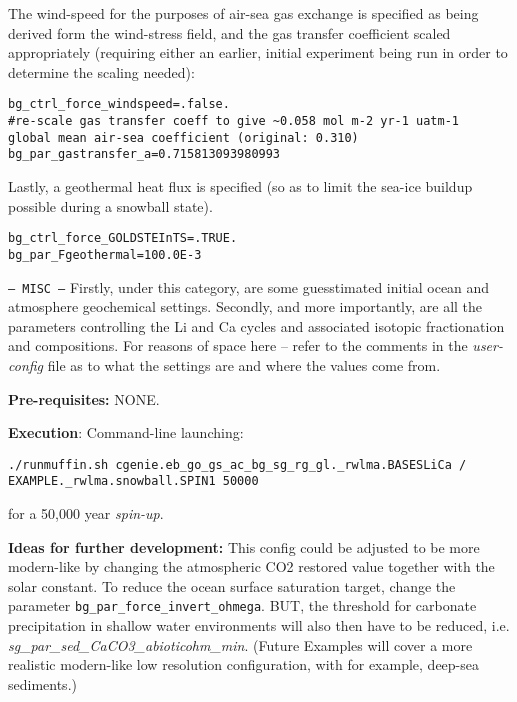 \documentclass[10pt,twoside]{article}
\begin{document}
\begin{compactitem}
        The wind-speed for the purposes of air-sea gas exchange is specified as being derived form the wind-stress field, and the gas transfer coefficient scaled appropriately (requiring either an earlier, initial experiment being run in order to determine the scaling needed):
                        \vspace{-5pt}\begin{verbatim}
bg_ctrl_force_windspeed=.false.
#re-scale gas transfer coeff to give ~0.058 mol m-2 yr-1 uatm-1 
global mean air-sea coefficient (original: 0.310)
bg_par_gastransfer_a=0.715813093980993
                \end{verbatim}\vspace{-5pt}
        Lastly, a geothermal heat flux is specified (so as to limit the sea-ice buildup possible during a snowball state).
                        \vspace{-5pt}\begin{verbatim}
bg_ctrl_force_GOLDSTEInTS=.TRUE.
bg_par_Fgeothermal=100.0E-3
                \end{verbatim}\vspace{-5pt}
        
        \item \texttt{--- MISC ---}
        Firstly, under this category, are some guesstimated initial ocean and atmosphere geochemical settings.
        Secondly, and more importantly, are all the parameters controlling the Li and Ca cycles and associated isotopic fractionation and compositions. For reasons of space here -- refer to the comments in the \textit{user-config} file as to what the settings are and where the values come from.

\end{compactitem}

\noindent \textbf{Pre-requisites:} NONE.

\noindent \textbf{Execution}: Command-line launching:
\vspace{-10pt}\begin{verbatim}./runmuffin.sh cgenie.eb_go_gs_ac_bg_sg_rg_gl._rwlma.BASESLiCa /
EXAMPLE._rwlma.snowball.SPIN1 50000\end{verbatim}\vspace{-10pt}
for a 50,000 year \textit{spin-up}.

\noindent \textbf{Ideas for further development:} 
This config could be adjusted to be more modern-like by changing the atmospheric CO2 restored value together with the solar constant. To reduce the ocean surface saturation target, change the parameter \texttt{bg\_par\_force\_invert\_ohmega}. BUT, the threshold for carbonate precipitation in shallow water environments will also then have to be reduced, i.e. \textit{sg\_par\_sed\_CaCO3\_abioticohm\_min}. (Future Examples will cover a more realistic modern-like low resolution configuration, with for example, deep-sea sediments.)
\end{document}
